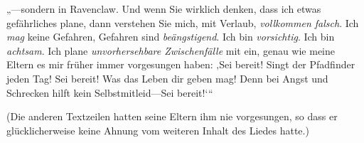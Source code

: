 „—sondern in Ravenclaw. Und wenn Sie wirklich denken, dass ich etwas gefährliches plane, dann verstehen Sie mich, mit Verlaub, \emph{vollkommen falsch}. Ich \emph{mag} keine Gefahren, Gefahren sind \emph{beängstigend}. Ich bin \emph{vorsichtig}. Ich bin \emph{achtsam}. Ich plane \emph{unvorhersehbare Zwischenfälle} mit ein, genau wie meine Eltern es mir früher immer vorgesungen haben: ‚Sei bereit! Singt der Pfadfinder jeden Tag! Sei bereit! Was das Leben dir geben mag! Denn bei Angst und Schrecken hilft kein Selbstmitleid—Sei bereit!‘“%

(Die anderen Textzeilen hatten seine Eltern ihm nie vorgesungen, so dass er glücklicherweise keine Ahnung vom weiteren Inhalt des Liedes hatte.)

